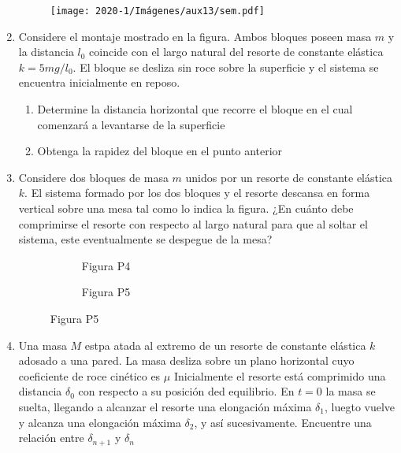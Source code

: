 \documentclass[letterpaper,11pt]{article}
\begin{document}
\begin{enumerate}
\begin{figure}[H]
    \centering
    \texttt{[image: 2020-1/Imágenes/aux13/sem.pdf]}
\end{figure}

\item Considere el montaje mostrado en la figura. Ambos bloques poseen masa $m$ y la distancia $l_0$ coincide con el largo natural del resorte de constante elástica $k = 5mg/l_0$. El bloque se desliza sin roce sobre la superficie y el sistema se encuentra inicialmente en reposo.

    \begin{enumerate}
        \item Determine la distancia horizontal que recorre el bloque en el cual comenzará a levantarse de la superficie
        
        \item Obtenga la rapidez del bloque en el punto anterior
    \end{enumerate}
    
\item Considere dos bloques de masa $m$ unidos por un resorte de constante elástica $k$. El sistema formado por los dos bloques y el resorte descansa en forma vertical sobre una mesa tal como lo indica la figura. ¿En cuánto debe comprimirse el resorte con respecto al largo natural para que al soltar el sistema, este eventualmente se despegue de la mesa?

\begin{figure}[H]
    \centering
    \begin{subfigure}[t]{0.45\textwidth}
        \centering
        
        \caption*{Figura P4}
    \end{subfigure}
    \hspace{0.1em}
    \begin{subfigure}[t]{0.45\textwidth}
        \centering
        
        \caption*{Figura P5}
    \end{subfigure}
\end{figure}

\item Una masa $M$ estpa atada al extremo de un resorte de constante elástica $k$ adosado a una pared. La masa desliza sobre un plano horizontal cuyo coeficiente de roce cinético es $\mu$ Inicialmente el resorte está comprimido una distancia $\delta_0$ con respecto a su posición ded equilibrio. En $t=0$ la masa se suelta, llegando a alcanzar el resorte una elongación máxima $\delta_1$, luegto vuelve y alcanza una elongación máxima $\delta_2$, y así sucesivamente. Encuentre una relación entre $\delta_{n+1}$ y $\delta_n$

\begin{figure}[htbp]
  \centering
  
\end{figure}



\end{enumerate}
\end{document}
